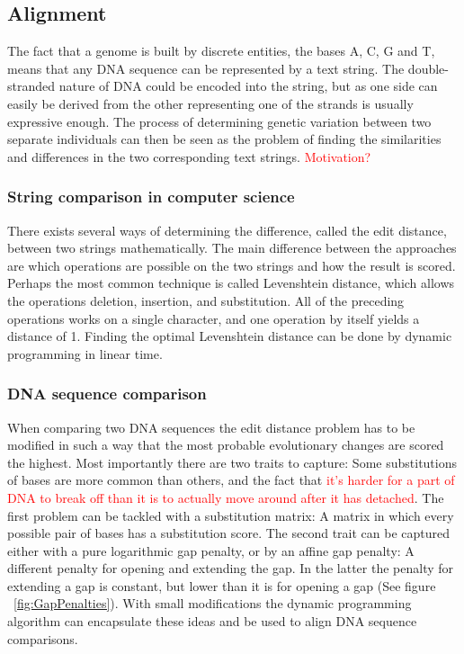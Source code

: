 \documentclass[thesis.tex]{subfiles}
\begin{document}
\subsection{Alignment}
The fact that a genome is built by discrete entities, the bases A, C, G and T, means that any DNA sequence can be represented by a text string. The double-stranded nature of DNA could be encoded into the string, but as one side can easily be derived from the other representing one of the strands is usually expressive enough. The process of determining genetic variation between two separate individuals can then be seen as the problem of finding the similarities and differences in the two corresponding text strings. \textcolor{red}{Motivation?}
\subsubsection{String comparison in computer science}
There exists several ways of determining the difference, called the edit distance, between two strings mathematically. The main difference between the approaches are which operations are possible on the two strings and how the result is scored. Perhaps the most common technique is called Levenshtein distance, which allows the operations deletion, insertion, and substitution. All of the preceding operations works on a single character, and one operation by itself yields a distance of 1. Finding the optimal Levenshtein distance can be done by dynamic programming in linear time.
\subsubsection{DNA sequence comparison}
When comparing two DNA sequences the edit distance problem has to be modified in such a way that the most probable evolutionary changes are scored the highest. Most importantly there are two traits to capture: Some substitutions of bases are more common than others, and the fact that \textcolor{red}{it's harder for a part of DNA to break off than it is to actually move around after it has detached}. The first problem can be tackled with a substitution matrix: A matrix in which every possible pair of bases has a substitution score. The second trait can be captured either with a pure logarithmic gap penalty, or by an affine gap penalty: A different penalty for opening and extending the gap. In the latter the penalty for extending a gap is constant, but lower than it is for opening a gap (See figure ~\ref{fig:GapPenalties}). With small modifications the dynamic programming algorithm can encapsulate these ideas and be used to align DNA sequence comparisons. 
\end{document}
